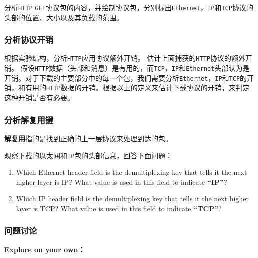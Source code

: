 \documentclass{article}
\begin{document}
	分析\texttt{HTTP} \texttt{GET}协议包的内容，并绘制协议包，分别标出\texttt{Ethernet}，\texttt{IP}和\texttt{TCP}协议的头部的位置、大小以及其负载的范围。
	
	\subsubsection{分析协议开销}
	
	根据实验结构，分析\texttt{HTTP}应用协议额外开销。
	估计上面捕获的\texttt{HTTP}协议的额外开销。
	假设\texttt{HTTP}数据（头部和消息）是有用的，而\texttt{TCP}，\texttt{IP}和\texttt{Ethernet}头部认为是开销。对于下载的主要部分中的每一个包，我们需要分析\texttt{Ethernet}，\texttt{IP}和\texttt{TCP}的开销，和有用的\texttt{HTTP}数据的开销。根据以上的定义来估计下载协议的开销，来判定这种开销是否有必要。
	
	\subsubsection{分析解复用键}
	
	\textbf{解复用}指的是找到正确的上一层协议来处理到达的包。
	
	观察下载的以太网和\texttt{IP}包的头部信息，回答下面问题：
	
	\begin{enumerate}[noitemsep]
		\item Which Ethernet header field is the demultiplexing key that tells it the next higher layer is IP? What value is used in this field to indicate \textbf{“IP”}?
		\item Which IP header field is the demultiplexing key that tells it the next higher layer is TCP? What value is used in this field to indicate \textbf{“TCP”}?
	\end{enumerate}
	
	\subsubsection{问题讨论}
	
	\textbf{Explore on your own：}
	
\end{document}
